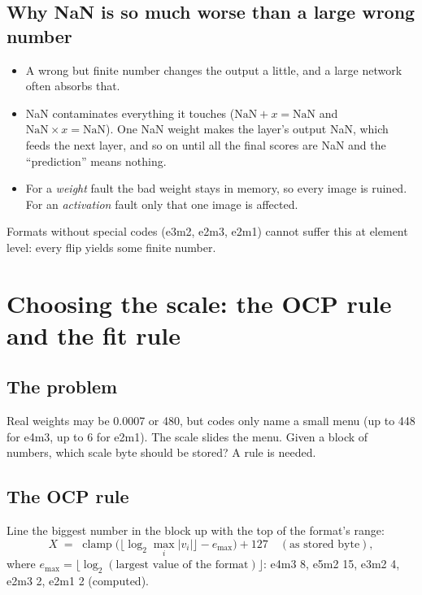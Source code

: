 \subsection{Why NaN is so much worse than a large wrong number}
\begin{itemize}
\item A wrong but finite number changes the output a little, and a large network often absorbs that.
\item NaN contaminates everything it touches ($\mathrm{NaN}+x=\mathrm{NaN}$ and $\mathrm{NaN}\times x=\mathrm{NaN}$).
 One NaN weight makes the layer's output NaN, which feeds the next layer, and so on until all the final scores
 are NaN and the ``prediction'' means nothing.
\item For a \emph{weight} fault the bad weight stays in memory, so every image is ruined. For an
 \emph{activation} fault only that one image is affected.
\end{itemize}
Formats without special codes (e3m2, e2m3, e2m1) cannot suffer this at element level: every flip yields some finite number.


\section{Choosing the scale: the OCP rule and the fit rule}

\subsection{The problem}
Real weights may be 0.0007 or 480, but codes only name a small menu (up to 448 for e4m3, up to 6 for e2m1). The
scale slides the menu. Given a block of numbers, which scale byte should be stored? A rule is needed.

\subsection{The OCP rule}
Line the biggest number in the block up with the top of the format's range:
\begin{equation}\label{eq:ocp}
X \;=\; \operatorname{clamp}\bigl(\lfloor\log_2\max_i|v_i|\rfloor-e_{\max}\bigr)+127\quad(\text{as stored byte}),
\end{equation}
where $e_{\max}=\lfloor\log_2(\text{largest value of the format})\rfloor$: e4m3 8, e5m2 15, e3m2 4, e2m3 2, e2m1 2
(computed).

